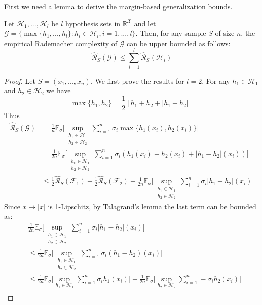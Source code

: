 First we need a lemma to derive the margin-based generalization bounds.
\begin{lemma}
	Let $\mathcal{H}_1,...,\mathcal{H}_l$ be $l$ hypothesis sets in $\mathbb{R}^{\mathcal{X}}$ and let $\mathcal{G} = \{ \max\{h_1,...,h_l\} : h_i \in \mathcal{H}_i, i=1,...,l\}$. Then, for any sample $S$ of size $n$, the empirical Rademacher complexity of $\mathcal{G}$ can be upper bounded as follows:
	\begin{equation}
	\hat{\mathcal{R}}_S(\mathcal{G}) \leq \sum_{i=1}^{l} \hat{\mathcal{R}}_S(\mathcal{H}_i)
	\end{equation}
\end{lemma}
\begin{proof}
	Let $S = (x_1,..., x_n)$. We first prove the results for $l = 2$. For any $h_1 \in \mathcal{H}_1$ and $h_2 \in \mathcal{H}_2$ we have
	\begin{equation}
	\max\{h_1, h_2\} = \frac{1}{2}[h_1 + h_2 + |h_1-h_2|]
	\end{equation}
	Thus
	\begin{align}
	\hat{\mathcal{R}}_S(\mathcal{G}) &= \frac{1}{n} \mathbb{E}_{\sigma} \bigg[\sup_{\substack{h_1 \in \mathcal{H}_1 \\ h_2 \in \mathcal{H}_2}}\sum_{i=1}^{n} \sigma_i \max\{h_1(x_i), h_2(x_i)\}\bigg] \\
	&= \frac{1}{2n} \mathbb{E}_{\sigma} \bigg[\sup_{\substack{h_1 \in \mathcal{H}_1 \\ h_2 \in \mathcal{H}_2}}\sum_{i=1}^{n} \sigma_i(h_1(x_i)+h_2(x_i)+ |h_1-h_2|(x_i))\bigg]\\
	&\leq \frac{1}{2}\hat{\mathcal{R}}_S(\mathcal{F}_1) + \frac{1}{2}\hat{\mathcal{R}}_S(\mathcal{F}_2) + \frac{1}{2n}\mathbb{E}_{\sigma} \bigg[\sup_{\substack{h_1 \in \mathcal{H}_1 \\ h_2 \in \mathcal{H}_2}}\sum_{i=1}^{n} \sigma_i|h_1-h_2|(x_i)\bigg]
	\end{align}
	Since  $x \mapsto |x|$
	is 1-Lipschitz, by Talagrand's lemma the last term can be bounded as:
	\begin{align}
	&\frac{1}{2n}\mathbb{E}_{\sigma} \bigg[\sup_{\substack{h_1 \in \mathcal{H}_1 \\ h_2 \in \mathcal{H}_2}}\sum_{i=1}^{n} \sigma_i|h_1-h_2|(x_i)\bigg] \\
	&\leq \frac{1}{2n}\mathbb{E}_{\sigma} \bigg[\sup_{\substack{h_1 \in \mathcal{H}_1 \\ h_2 \in \mathcal{H}_2}}\sum_{i=1}^{n} \sigma_i(h_1-h_2)(x_i)\bigg] \\
	&\leq \frac{1}{2n}\mathbb{E}_{\sigma} \bigg[\sup_{h_1 \in \mathcal{H}_1}\sum_{i=1}^{n} \sigma_ih_1(x_i)\bigg] + \frac{1}{2n}\mathbb{E}_{\sigma} \bigg[\sup_{h_2 \in \mathcal{H}_2}\sum_{i=1}^{n} -\sigma_ih_2(x_i)\bigg]\\

\end{align}
\end{proof}
